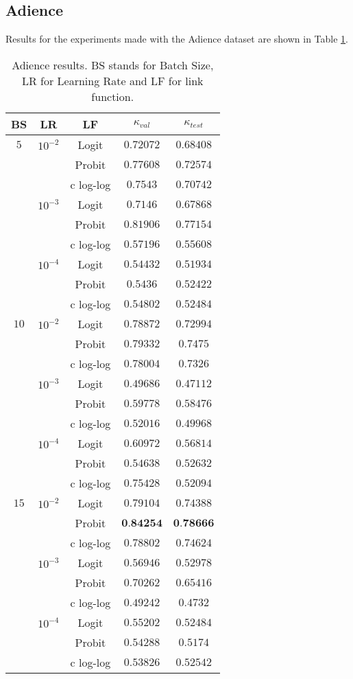 \documentclass[10pt, a4paper, titlepage, twocolumn]{article}
\begin{document}
	\subsection{Adience}
	Results for the experiments made with the Adience dataset are shown in Table \ref{table:Adienceresults}.
	
	\begin{table}[htbp]
		\footnotesize
		\centering
		\begin{tabular}{ccc|cc}
			BS & LR & LF & $\kappa_{val}$ & $\kappa_{test}$\\\hline\addlinespace[0.05cm]
			$5$ & $10^{-2}$ & Logit & $0.72072$ & $0.68408$\\
			& & Probit & $0.77608$ & $0.72574$\\
			& & c log-log & $0.7543$ & $0.70742$\\
			& $10^{-3}$ & Logit & $0.7146$ & $0.67868$\\
			& & Probit & $0.81906$ & $0.77154$\\
			& & c log-log & $0.57196$ & $0.55608$\\
			& $10^{-4}$ & Logit & $0.54432$ & $0.51934$\\
			& & Probit & $0.5436$ & $0.52422$\\
			& & c log-log & $0.54802$ & $0.52484$\\
			$10$ & $10^{-2}$ & Logit & $0.78872$ & $0.72994$\\
			& & Probit & $0.79332$ & $0.7475$\\
			& & c log-log & $0.78004$ & $0.7326$\\
			& $10^{-3}$ & Logit & $0.49686$ & $0.47112$\\
			& & Probit & $0.59778$ & $0.58476$\\
			& & c log-log & $0.52016$ & $0.49968$\\
			& $10^{-4}$ & Logit & $0.60972$ & $0.56814$\\
			& & Probit & $0.54638$ & $0.52632$\\
			& & c log-log & $0.75428$ & $0.52094$\\
			$15$ & $10^{-2}$ & Logit & $0.79104$ & $0.74388$\\
			& & Probit & $\textbf{0.84254}$ & $\textbf{0.78666}$\\
			& & c log-log & $0.78802$ & $0.74624$\\
			& $10^{-3}$ & Logit & $0.56946$ & $0.52978$\\
			& & Probit & $0.70262$ & $0.65416$\\
			& & c log-log & $0.49242$ & $0.4732$\\
			& $10^{-4}$ & Logit & $0.55202$ & $0.52484$\\
			& & Probit & $0.54288$ & $0.5174$\\
			& & c log-log & $0.53826$ & $0.52542$
		\end{tabular}
		\caption{Adience results. BS stands for Batch Size, LR for Learning Rate and LF for link function.}
		\label{table:Adienceresults}
	\end{table}
	
\end{document}
